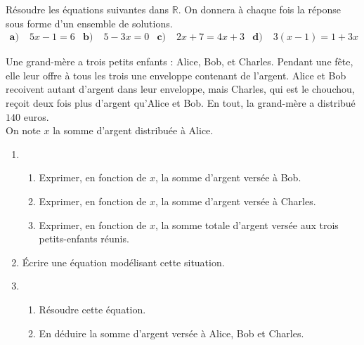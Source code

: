 \documentclass[11pt]{article}
\begin{document}
\begin{exo}[$5,5$ points]
  Résoudre les équations suivantes dans $\mathbb{R}$. On donnera à chaque fois
  la réponse sous forme d'un ensemble de solutions.
  \begin{align*}
    \textbf{a)}\;& 5x - 1 = 6 &
    \textbf{b)}\;& 5 - 3x = 0 &
    \textbf{c)}\;& 2x + 7 = 4x + 3 &
    \textbf{d)}\;& 3(x-1) = 1 + 3x
  \end{align*}
\end{exo}

\begin{exo}[$3,5$ points]
  Une grand-mère a trois petits enfants : Alice, Bob, et Charles. Pendant une
  fête, elle leur offre à tous les trois une enveloppe contenant de l'argent.
  Alice et Bob recoivent autant d'argent dans leur enveloppe, mais Charles, qui
  est le chouchou, reçoit deux fois plus d'argent qu'Alice et Bob. En tout, la
  grand-mère a distribué $140$ euros.\\
  On note $x$ la somme d'argent distribuée à Alice.
  \begin{enumerate}

    \item \begin{enumerate}
        \item Exprimer, en fonction de $x$, la somme d'argent versée à Bob.
        \item Exprimer, en fonction de $x$, la somme d'argent versée à Charles.
        \item Exprimer, en fonction de $x$, la somme totale d'argent versée aux
          trois petits-enfants réunis.
      \end{enumerate}
    \item Écrire une équation modélisant cette situation.
    \item \begin{enumerate}
        \item Résoudre cette équation.
        \item En déduire la somme d'argent versée à Alice, Bob et Charles.
      \end{enumerate}
  \end{enumerate}
\end{exo}
\end{document}
